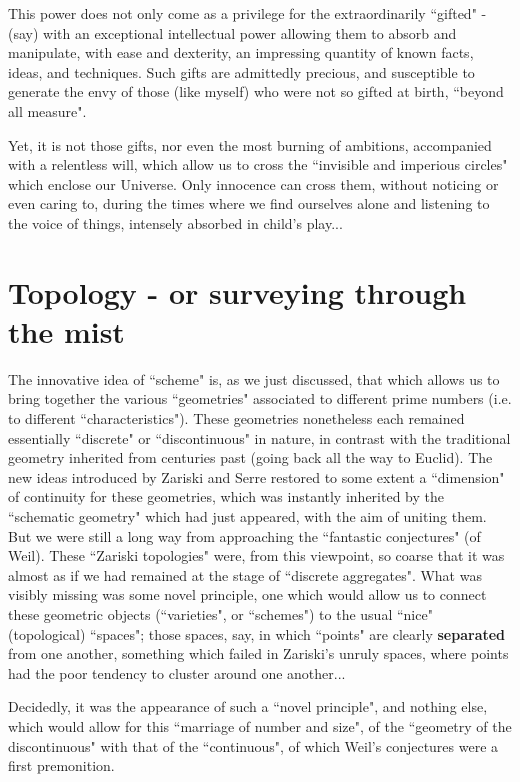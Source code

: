 This power does not only come as a privilege for the extraordinarily ``gifted" - (say) with an exceptional intellectual power allowing them to absorb and manipulate, with ease and dexterity, an impressing quantity of known facts, ideas, and techniques. Such gifts are admittedly precious, and susceptible to generate the envy of those (like myself) who were not so gifted at birth, ``beyond all measure".

Yet, it is not those gifts, nor even the most burning of ambitions, accompanied with a relentless will, which allow us to cross the ``invisible and imperious circles" which enclose our Universe. Only innocence can cross them, without noticing or even caring to, during the times where we find ourselves alone and listening to the voice of things, intensely absorbed in child's play...

\section{Topology - or surveying through the mist} 

The innovative idea of ``scheme" is, as we just discussed, that which allows us to bring together the various ``geometries" associated to different prime numbers (i.e. to different ``characteristics"). These geometries nonetheless each remained essentially ``discrete" or ``discontinuous" in nature, in contrast with the traditional geometry inherited from centuries past (going back all the way to Euclid). The new ideas introduced by Zariski and Serre restored to some extent a ``dimension" of continuity for these geometries, which was instantly inherited by the ``schematic geometry" which had just appeared, with the aim of uniting them. But we were still a long way from approaching the ``fantastic conjectures" (of Weil). These ``Zariski topologies" were, from this viewpoint, so coarse that it was almost as if we had remained at the stage of ``discrete aggregates". What was visibly missing was some novel principle, one which would allow us to connect these geometric objects (``varieties", or ``schemes") to the usual ``nice" (topological) ``spaces"; those spaces, say, in which ``points" are clearly \textbf{separated} from one another, something which failed in Zariski's unruly spaces, where points had the poor tendency to cluster around one another...

Decidedly, it was the appearance of such a ``novel principle", and nothing else, which would allow for this ``marriage of number and size", of the ``geometry of the discontinuous" with that of the ``continuous", of which Weil's conjectures were a first premonition.

